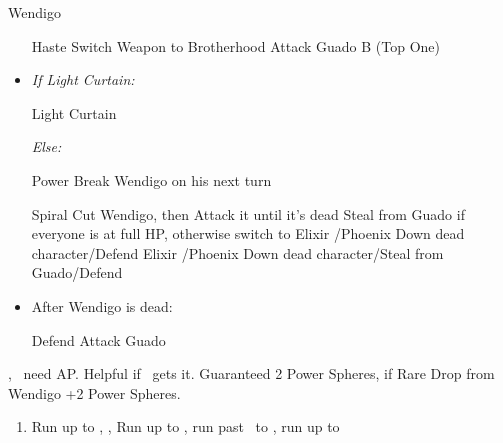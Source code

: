 \begin{battle}[18000]{Wendigo}
    \begin{itemize}
        \tidusf Haste \tidus
        \tidusf Switch Weapon to Brotherhood
        \tidusf Attack Guado B (Top One)
        \item \textit{If Light Curtain:}
        \begin{itemize}
            \rikkuf Light Curtain \tidus
        \end{itemize}
        \textit{Else:}
        \begin{itemize}
            \switch{\rikku}{\auron}
            \auronf Power Break Wendigo
            \switch{\auron}{\rikku} on his next turn
        \end{itemize}
        \tidusf Spiral Cut Wendigo, then Attack it until it's dead
        \kimahrif Steal from Guado if everyone is at full HP, otherwise switch to \lulu
        \luluf Elixir \tidus/Phoenix Down dead character/Defend
        \rikkuf Elixir \tidus/Phoenix Down dead character/Steal from Guado/Defend
        \item After Wendigo is dead:
        \begin{itemize}
            \yunaf Defend
            \tidusf Attack Guado
        \end{itemize}
    \end{itemize}
    \yuna, \tidus\ need AP. Helpful if \lulu\ gets it.
    Guaranteed 2 Power Spheres, if Rare Drop from Wendigo +2 Power Spheres.
\end{battle}
\begin{enumerate}[resume]
    \item Run up to \rikku, \save, Run up to \yuna, run past \kimahri\ to , run up to \auron\
\end{enumerate}
\lossnp\bothcb\bothnpsingle
